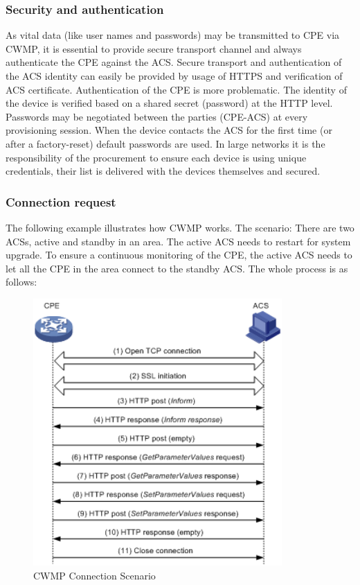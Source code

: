 \subsubsection{Security and authentication}
As vital data (like user names and passwords) may be transmitted to CPE via CWMP, it is essential to provide secure transport channel and always authenticate the CPE against the ACS. Secure transport and authentication of the ACS identity can easily be provided by usage of HTTPS and verification of ACS certificate. Authentication of the CPE is more problematic. The identity of the device is verified based on a shared secret (password) at the HTTP level. Passwords may be negotiated between the parties (CPE-ACS) at every provisioning session. When the device contacts the ACS for the first time (or after a factory-reset) default passwords are used. In large networks it is the responsibility of the procurement to ensure each device is using unique credentials, their list is delivered with the devices themselves and secured.


\subsubsection{Connection request}

The following example illustrates how CWMP works. The scenario: There are two ACSs, active and standby in an area. The active ACS needs to restart for system upgrade. To ensure a continuous monitoring of the CPE, the active ACS needs to let all the CPE in the area connect to the standby ACS. The whole process is as follows:

\begin{figure}[htbp]
	\centering
		\includegraphics[width=9.5cm]{Figures/connection_request.png}
	\caption[CWMP Connection Scenario]{CWMP Connection Scenario}
	\label{fig:connectionrequest}
\end{figure}


